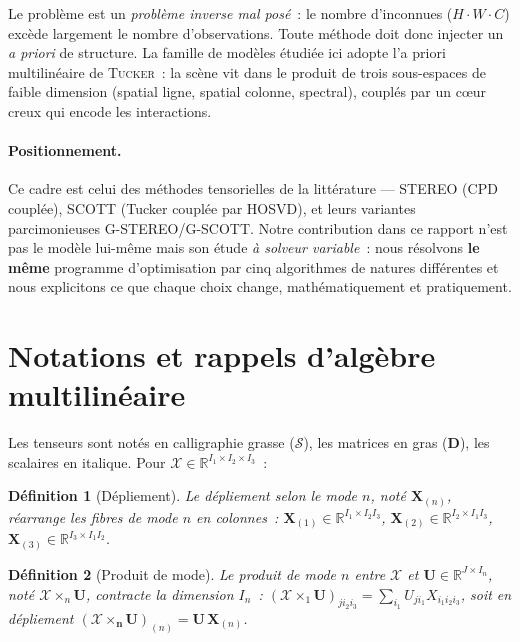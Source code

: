 \documentclass[11pt,a4paper]{article}
\newtheorem{definition}{Définition}
\newcommand{\R}{\mathbb{R}}
\newcommand{\T}[1]{\bm{\mathcal{#1}}}          %
\newcommand{\M}[1]{\bm{#1}}                     %
\newcommand{\unfold}[2]{\M{#1}_{(#2)}}
\begin{document}
Le problème est un \emph{problème inverse mal posé}~: le nombre d'inconnues
($H\!\cdot\!W\!\cdot\!C$) excède largement le nombre d'observations. Toute
méthode doit donc injecter un \emph{a priori} de structure. La famille de
modèles étudiée ici adopte l'a priori multilinéaire de \textsc{Tucker}~: la
scène vit dans le produit de trois sous-espaces de faible dimension (spatial
ligne, spatial colonne, spectral), couplés par un c\oe ur creux qui encode les
interactions.

\paragraph{Positionnement.} Ce cadre est celui des méthodes tensorielles de la
littérature — STEREO (CPD couplée), SCOTT (Tucker couplée par HOSVD), et leurs
variantes parcimonieuses G-STEREO/G-SCOTT. Notre contribution dans ce rapport
n'est pas le modèle lui-même mais son étude \emph{à solveur variable}~: nous
résolvons \textbf{le même} programme d'optimisation par cinq algorithmes de
natures différentes et nous explicitons ce que chaque choix change,
mathématiquement et pratiquement.

\section{Notations et rappels d'algèbre multilinéaire}

Les tenseurs sont notés en calligraphie grasse ($\T{S}$), les matrices en gras
($\M{D}$), les scalaires en italique. Pour $\T{X}\in\R^{I_1\times I_2\times
I_3}$~:

\begin{definition}[Dépliement]
Le dépliement selon le mode $n$, noté $\unfold{X}{n}$, réarrange les fibres de
mode $n$ en colonnes~: $\unfold{X}{1}\in\R^{I_1\times I_2 I_3}$,
$\unfold{X}{2}\in\R^{I_2\times I_1 I_3}$, $\unfold{X}{3}\in\R^{I_3\times I_1
I_2}$.
\end{definition}

\begin{definition}[Produit de mode]
Le produit de mode $n$ entre $\T{X}$ et $\M{U}\in\R^{J\times I_n}$, noté
$\T{X}\times_n \M{U}$, contracte la dimension $I_n$~:
$(\T{X}\times_1\M{U})_{j i_2 i_3} = \sum_{i_1} U_{j i_1} X_{i_1 i_2 i_3}$,
soit en dépliement $\unfold{(\T{X}\times_n\M{U})}{n} = \M{U}\,\unfold{X}{n}$.
\end{definition}
\end{document}
